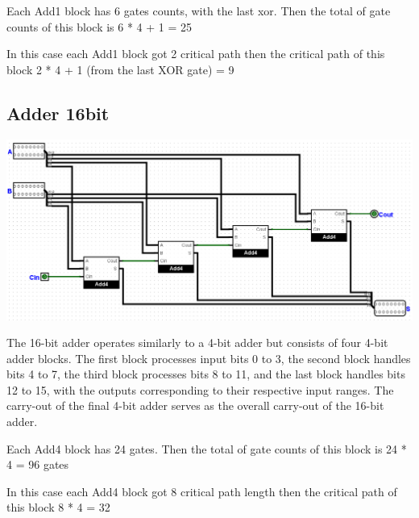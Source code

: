 \documentclass{article}
\begin{document}
\hspace{2em}Each Add1 block has 6 gates counts, with the last xor. Then the total of gate counts of this block is 6 * 4 + 1 = 25

\hspace{2em}In this case each Add1 block got 2 critical path then the critical path of this block 2 * 4 + 1 (from the last XOR gate) = 9
\subsection{Adder 16bit}
\begin{center}
    \includegraphics[width=1\textwidth]{images/Add16.png}
\end{center}
\hspace*{2em}The 16-bit adder operates similarly to a 4-bit adder but consists of four 4-bit adder blocks. The first block processes input bits 0 to 3, the second block handles bits 4 to 7, the third block processes bits 8 to 11, and the last block handles bits 12 to 15, with the outputs corresponding to their respective input ranges. The carry-out of the final 4-bit adder serves as the overall carry-out of the 16-bit adder.

\hspace{2em}Each Add4 block has 24 gates. Then the total of gate counts of this block is 24 * 4 = 96 gates

\hspace{2em}In this case each Add4 block got 8 critical path length then the critical path of this block 8 * 4 = 32
\end{document}
